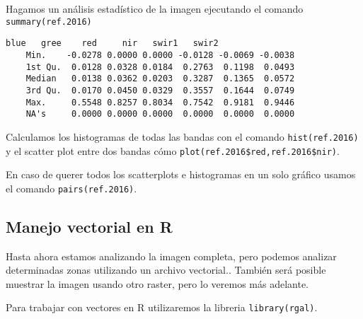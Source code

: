 \begin{exa}

    Hagamos un an\'alisis estad\'istico de la imagen ejecutando el
    comando \texttt{summary(ref.2016)}
    \begin{Verbatim}[fontsize=\small]
               blue   gree    red     nir   swir1   swir2
    Min.    -0.0278 0.0000 0.0000 -0.0128 -0.0069 -0.0038
    1st Qu.  0.0128 0.0328 0.0184  0.2763  0.1198  0.0493
    Median   0.0138 0.0362 0.0203  0.3287  0.1365  0.0572
    3rd Qu.  0.0170 0.0450 0.0329  0.3557  0.1644  0.0749
    Max.     0.5548 0.8257 0.8034  0.7542  0.9181  0.9446
    NA's     0.0000 0.0000 0.0000  0.0000  0.0000  0.0000
    \end{Verbatim}
    Calculamos los histogramas de todas las bandas con el
    comando \texttt{hist(ref.2016)} y el scatter plot entre dos bandas c\'omo
  \verb|plot(ref.2016$red,ref.2016$nir)|.

    En caso de querer todos los scatterplots e histogramas en un solo gr\'afico
    usamos el comando \texttt{pairs(ref.2016)}.
    \end{exa}


\subsection{Manejo vectorial en R}

Hasta ahora estamos analizando la imagen completa, pero podemos analizar
determinadas zonas utilizando un archivo vectorial.. Tambi\'en ser\'a
posible muestrar la imagen usando otro raster, pero lo veremos m\'as adelante.

Para trabajar con vectores en R utilizaremos la libreria
\texttt{library(rgal)}.

